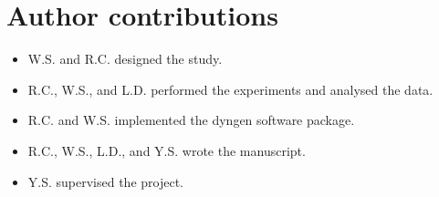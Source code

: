 \documentclass[
  table,
  10pt,
  a4paper]{article}
\providecommand{\tightlist}{%
  \setlength{\itemsep}{0pt}\setlength{\parskip}{0pt}}
\begin{document}
\hypertarget{author-contributions}{%
\section{Author contributions}\label{author-contributions}}

\begin{itemize}
\tightlist
\item
  W.S. and R.C. designed the study.
\item
  R.C., W.S., and L.D. performed the experiments and analysed the data.
\item
  R.C. and W.S. implemented the dyngen software package.
\item
  R.C., W.S., L.D., and Y.S. wrote the manuscript.
\item
  Y.S. supervised the project.
\end{itemize}

\printbibliography
\end{document}
